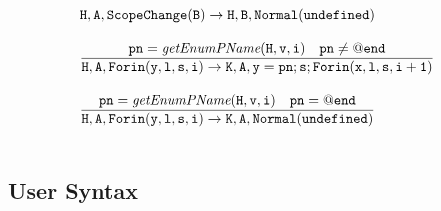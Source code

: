 \documentclass[a4paper, leqno]{amsart}
\begin{document}
\[\begin{array}{l@{}l@{}ll}
    
 & \ \ & {\tt H,A,ScopeChange(B) \rightarrow H,B,Normal(undefined) }& \\    
 & & \\
  
 
 & \ \ & \frac{
    \begin{matrix}
       {\tt pn = \emph{getEnumPName}(H,v,i)} & {\tt pn \neq @end}
    \end{matrix}}{
    \begin{matrix}
       {\tt H,A,Forin(y,l,s,i) \rightarrow K,A,y=pn; s; Forin(x,l,s,i+1)}
    \end{matrix}} & \\  
 & & \\
 
 
 & \ \ & \frac{
    \begin{matrix}
       {\tt pn = \emph{getEnumPName}(H,v,i)} & {\tt pn = @end}
    \end{matrix}}{
    \begin{matrix}
       {\tt H,A,Forin(y,l,s,i) \rightarrow K,A,Normal(undefined)}
    \end{matrix}} & \\  
 & & \\
 
\end{array}
\]

\subsection{User Syntax}
\end{document}
